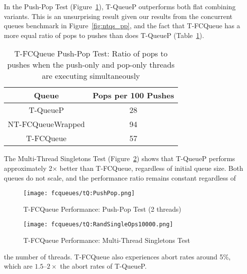 In the Push-Pop Test (Figure~\ref{fig:tqs_pp}), T-QueueP outperforms both flat combining variants. This is an unsurprising result given our results from the concurrent queues benchmark in Figure~\ref{fig:ntqs_pp}, and the fact that T-FCQueue has a more equal ratio of pops to pushes than does T-QueueP (Table~\ref{tab:tfc_pop_push_ratio}). 

\begin{table}[t!]
        \centering
    \begin{tabular}{|cc|}
        \hline
        Queue & Pops per 100 Pushes\\
        \hline
            T-QueueP & 28\\
            NT-FCQueueWrapped & 94\\
            T-FCQueue & 57\\
        \hline
    \end{tabular}
    \caption{T-FCQueue Push-Pop Test: Ratio of pops to pushes when the push-only and pop-only threads are executing simultaneously}
    \label{tab:tfc_pop_push_ratio}
\end{table}
The Multi-Thread Singletons Test (Figure~\ref{fig:tqs}) shows that T-QueueP performs approximately 2$\times$ better than T-FCQueue, regardless of initial queue size. Both queues do not scale, and the performance ratio remains constant regardless of

\begin{figure}[t!]
    \centering
	\begin{minipage}{\textwidth}
        {\texttt{[image: fcqueues/tQ:PushPop.png]}}
	\end{minipage}
        \caption{T-FCQueue Performance: Push-Pop Test (2 threads)}
        \label{fig:tqs_pp}
\end{figure}
\begin{figure}[H]
    \centering
   	\begin{minipage}{\textwidth}
        {\texttt{[image: fcqueues/tQ:RandSingleOps10000.png]}}
	\end{minipage}
    \caption{T-FCQueue Performance: Multi-Thread Singletons Test}
    \label{fig:tqs}
\end{figure}

\noindent the number of threads. T-FCQueue also experiences abort rates around 5\%, which are $1.5$--$2\times$ the abort rates of T-QueueP.

\vspace{12pt}
\noindent{}

